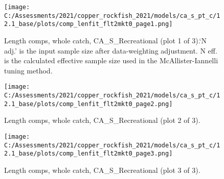 \documentclass[11pt,
  english,
  a4paper,
]{article}
\begin{document}
\tagmcend\tagstructend


\begin{figure}
\centering
\texttt{[image: C:/Assessments/2021/copper\_rockfish\_2021/models/ca\_s\_pt\_c/12.1\_base/plots/comp\_lenfit\_flt2mkt0\_page1.png]}
\caption{Length comps, whole catch, CA\_S\_Recreational (plot 1 of 3).`N adj.' is the input sample size after data-weighting adjustment. N eff. is the calculated effective sample size used in the McAllister-Iannelli tuning method.\label{fig:comp_lenfit_flt2mkt0_page1}}
\end{figure}

\tagmcend\tagstructend


\begin{figure}
\centering
\texttt{[image: C:/Assessments/2021/copper\_rockfish\_2021/models/ca\_s\_pt\_c/12.1\_base/plots/comp\_lenfit\_flt2mkt0\_page2.png]}
\caption{Length comps, whole catch, CA\_S\_Recreational (plot 2 of 3).\label{fig:comp_lenfit_flt2mkt0_page2}}
\end{figure}

\tagmcend\tagstructend


\begin{figure}
\centering
\texttt{[image: C:/Assessments/2021/copper\_rockfish\_2021/models/ca\_s\_pt\_c/12.1\_base/plots/comp\_lenfit\_flt2mkt0\_page3.png]}
\caption{Length comps, whole catch, CA\_S\_Recreational (plot 3 of 3).\label{fig:comp_lenfit_flt2mkt0_page3}}
\end{figure}

\tagmcend\tagstructend

\end{document}
